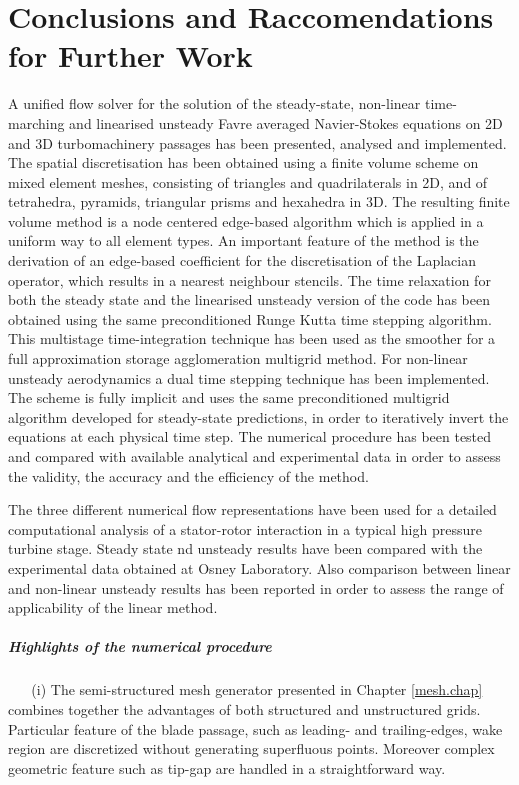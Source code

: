%
%
%
%
\chapter{Conclusions and Raccomendations for Further Work}
\label{conclusion.chap}
%
 A unified flow solver for the solution of the steady-state, non-linear
 time-marching and linearised unsteady Favre averaged Navier-Stokes equations
 on 2D and 3D turbomachinery passages has been presented,
 analysed and implemented.
 The spatial discretisation has been obtained using a finite volume scheme
 on mixed element meshes, consisting of triangles and quadrilaterals in 2D,
 and of tetrahedra, pyramids, triangular prisms and hexahedra in 3D.
 The resulting finite volume method is a node centered edge-based algorithm
 which is applied in a uniform way to all element types.
 An important feature of the method is the derivation of an edge-based coefficient
 for the discretisation of the Laplacian operator, which results in a nearest
 neighbour stencils.
 The time relaxation for both the steady state and the linearised unsteady
 version of the code has been obtained using the same preconditioned
 Runge Kutta time stepping algorithm. This multistage time-integration technique
 has been used as the smoother for a full approximation storage
 agglomeration multigrid method.
 For non-linear unsteady aerodynamics a dual time stepping technique
 has been implemented. The scheme is fully implicit and uses the same preconditioned
 multigrid algorithm developed for steady-state predictions, in order to iteratively
 invert the equations at each physical time step.
 The numerical procedure has been tested and compared with available analytical and
 experimental data in order to assess the validity, the accuracy and the efficiency
 of the method.

 The three different numerical flow representations have been used for
 a detailed computational analysis of a stator-rotor interaction in a typical
 high pressure turbine stage. Steady state nd unsteady results have been
 compared with the experimental data obtained at Osney Laboratory.
 Also comparison between linear and non-linear unsteady results has been
 reported in order to assess the range of applicability of the linear
 method.
%
%
%
\paragraph{Highlights of the numerical procedure}

~\newline
~\newline
%
(i)
 The semi-structured mesh generator presented in Chapter \ref{mesh.chap}
 combines together the advantages of both structured and unstructured grids.
 Particular feature of the blade passage, such as leading- and trailing-edges,
 wake region are discretized without generating superfluous points.
 Moreover complex geometric feature such as tip-gap are handled in a straightforward
 way.

